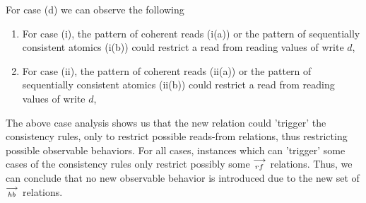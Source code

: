     For case (d) we can observe the following 
    \begin{enumerate}
        \item For case (i), the pattern of coherent reads (i(a)) or the pattern of sequentially consistent atomics (i(b)) could restrict a read from reading values of write $d$, 
        \item For case (ii), the pattern of coherent reads (ii(a)) or the pattern of sequentially consistent atomics (ii(b)) could restrict a read from reading values of write $d$, 
    \end{enumerate}
  
    The above case analysis shows us that the new relation could 'trigger' the consistency rules, only to restrict possible reads-from relations, thus restricting possible observable behaviors. For all cases, instances which can 'trigger' some cases of the consistency rules only restrict possibly some $\stackrel{\longrightarrow}{_{rf}}$ relations. Thus, we can conclude that no new observable behavior is introduced due to the new set of $\stackrel{\longrightarrow}{_{hb}}$ relations. 
    

    